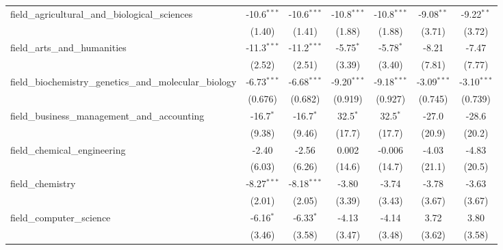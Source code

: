 \begin{tabular}{lcccccc}
   field\_agricultural\_and\_biological\_sciences              & -10.6$^{***}$ & -10.6$^{***}$ & -10.8$^{***}$ & -10.8$^{***}$ & -9.08$^{**}$  & -9.22$^{**}$\\   
                                                               & (1.40)        & (1.41)        & (1.88)        & (1.88)        & (3.71)        & (3.72)\\   
   field\_arts\_and\_humanities                                & -11.3$^{***}$ & -11.2$^{***}$ & -5.75$^{*}$   & -5.78$^{*}$   & -8.21         & -7.47\\   
                                                               & (2.52)        & (2.51)        & (3.39)        & (3.40)        & (7.81)        & (7.77)\\   
   field\_biochemistry\_genetics\_and\_molecular\_biology      & -6.73$^{***}$ & -6.68$^{***}$ & -9.20$^{***}$ & -9.18$^{***}$ & -3.09$^{***}$ & -3.10$^{***}$\\   
                                                               & (0.676)       & (0.682)       & (0.919)       & (0.927)       & (0.745)       & (0.739)\\   
   field\_business\_management\_and\_accounting                & -16.7$^{*}$   & -16.7$^{*}$   & 32.5$^{*}$    & 32.5$^{*}$    & -27.0         & -28.6\\   
                                                               & (9.38)        & (9.46)        & (17.7)        & (17.7)        & (20.9)        & (20.2)\\   
   field\_chemical\_engineering                                & -2.40         & -2.56         & 0.002         & -0.006        & -4.03         & -4.83\\   
                                                               & (6.03)        & (6.26)        & (14.6)        & (14.7)        & (21.1)        & (20.5)\\   
   field\_chemistry                                            & -8.27$^{***}$ & -8.18$^{***}$ & -3.80         & -3.74         & -3.78         & -3.63\\   
                                                               & (2.01)        & (2.05)        & (3.39)        & (3.43)        & (3.67)        & (3.67)\\   
   field\_computer\_science                                    & -6.16$^{*}$   & -6.33$^{*}$   & -4.13         & -4.14         & 3.72          & 3.80\\   
                                                               & (3.46)        & (3.58)        & (3.47)        & (3.48)        & (3.62)        & (3.58)\\   

\end{tabular}
